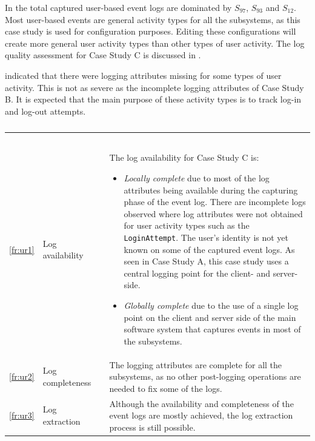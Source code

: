 In  the total captured user-based event logs are dominated by $S_{97}$, $S_{93}$ and $S_{12}$. Most user-based events are general activity types for all the subsystems, as this case study is used for configuration purposes. Editing these configurations will create more general user activity types than other types of user activity. The log quality assessment for Case Study C is discussed in . \par {} indicated that there were logging attributes missing for some types of user activity. This is not as severe as the incomplete logging attributes of Case Study B. It is expected that the main purpose of these activity types is to track log-in and log-out attempts.

\begin{xltabular}{\textwidth}{clcX}
	\caption[Logging quality assessment of Case Study C]{\textit{Logging quality assessment of Case Study C}}\label{tbl:ch3_caseCQuality}\\
	\toprule
	 &  &  &  \\
	\midrule
	\endfirsthead

	\caption[]{\continueCaption} \\
	\toprule
	 &  &  &  \\
	\midrule
	\endhead

	\midrule
	 \\ 
	\endfoot
	\endlastfoot

	\ref{fr:ur1} & Log availability & \cmark & \RaggedRight The log availability for Case Study C is: \begin{itemize}
			\item \textit{Locally complete} due to most of the log attributes being available during the capturing phase of the event log. There are incomplete logs observed where log attributes were not obtained for user activity types such as the \texttt{LoginAttempt}. The user's identity is not yet known on some of the captured event logs. As seen in Case Study A, this case study uses a central logging point for the client- and server-side.
			\item \textit{Globally complete} due to the use of a single log point on the client and server side of the main software system that captures events in most of the subsystems. 
		\end{itemize} \\
	\ref{fr:ur2} & Log completeness & \cmark & The logging attributes are complete for all the subsystems, as no other post-logging operations are needed to fix some of the logs. \\
	\ref{fr:ur3} & Log extraction & \cmark & Although the availability and completeness of the event logs are mostly achieved, the log extraction process is still possible. \\
	\bottomrule
\end{xltabular}


